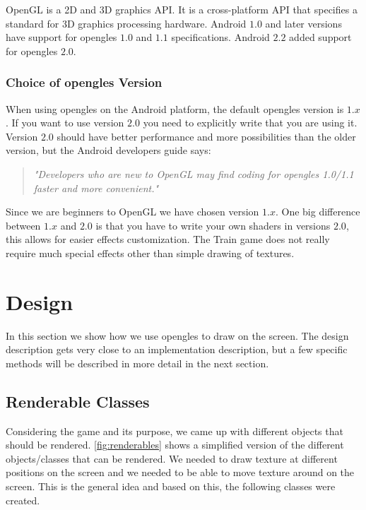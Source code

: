 OpenGL is a 2D and 3D graphics API. It is a cross-platform API that specifies a standard for 3D graphics processing hardware. Android $1.0$ and later versions have support for \ac{opengles} $1.0$ and $1.1$ specifications. Android $2.2$ added support for \ac{opengles} $2.0$. \citep{androidopengl, khronosopengles}

\subsubsection*{Choice of \ac{opengles} Version}
When using \ac{opengles} on the Android platform, the default \ac{opengles} version is $1.x$. If you want to use version $2.0$ you need to explicitly write that you are using it. Version $2.0$ should have better performance and more possibilities than the older version, but the Android developers guide says:
\begin{quote}
\textit{"Developers who are new to OpenGL may find coding for \ac{opengles} 1.0/1.1 faster and more convenient."} \citep{androidopengl}
\end{quote}
Since we are beginners to OpenGL we have chosen version $1.x$. One big difference between $1.x$ and $2.0$ is that you have to write your own shaders in versions $2.0$, this allows for easier effects customization. The Train game does not really require much special effects other than simple drawing of textures.

\section{Design}

In this section we show how we use \ac{opengles} to draw on the screen. The design description gets very close to an implementation description, but a few specific methods will be described in more detail in the next section.

\subsection{Renderable Classes}

Considering the game and its purpose, we came up with different objects that should be rendered. \autoref{fig:renderables} shows a simplified version of the different objects/classes that can be rendered. We needed to draw texture at different positions on the screen and we needed to be able to move texture around on the screen. This is the general idea and based on this, the following classes were created.

